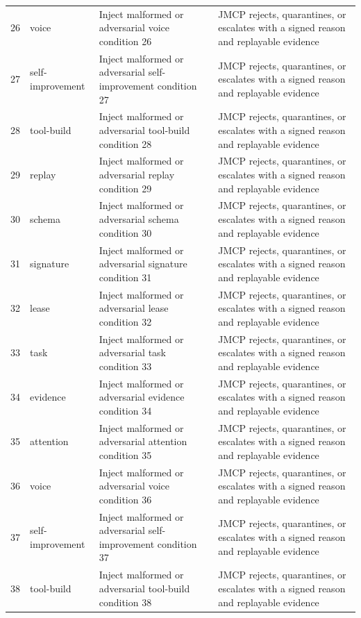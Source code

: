 \documentclass[10pt,journal,onecolumn]{IEEEtran}
\begin{document}
\begin{longtable}{P{0.05\textwidth} P{0.16\textwidth} P{0.38\textwidth} P{0.33\textwidth}}
26 & voice & Inject malformed or adversarial voice condition 26 & JMCP rejects, quarantines, or escalates with a signed reason and replayable evidence \\
27 & self-improvement & Inject malformed or adversarial self-improvement condition 27 & JMCP rejects, quarantines, or escalates with a signed reason and replayable evidence \\
28 & tool-build & Inject malformed or adversarial tool-build condition 28 & JMCP rejects, quarantines, or escalates with a signed reason and replayable evidence \\
29 & replay & Inject malformed or adversarial replay condition 29 & JMCP rejects, quarantines, or escalates with a signed reason and replayable evidence \\
30 & schema & Inject malformed or adversarial schema condition 30 & JMCP rejects, quarantines, or escalates with a signed reason and replayable evidence \\
31 & signature & Inject malformed or adversarial signature condition 31 & JMCP rejects, quarantines, or escalates with a signed reason and replayable evidence \\
32 & lease & Inject malformed or adversarial lease condition 32 & JMCP rejects, quarantines, or escalates with a signed reason and replayable evidence \\
33 & task & Inject malformed or adversarial task condition 33 & JMCP rejects, quarantines, or escalates with a signed reason and replayable evidence \\
34 & evidence & Inject malformed or adversarial evidence condition 34 & JMCP rejects, quarantines, or escalates with a signed reason and replayable evidence \\
35 & attention & Inject malformed or adversarial attention condition 35 & JMCP rejects, quarantines, or escalates with a signed reason and replayable evidence \\
36 & voice & Inject malformed or adversarial voice condition 36 & JMCP rejects, quarantines, or escalates with a signed reason and replayable evidence \\
37 & self-improvement & Inject malformed or adversarial self-improvement condition 37 & JMCP rejects, quarantines, or escalates with a signed reason and replayable evidence \\
38 & tool-build & Inject malformed or adversarial tool-build condition 38 & JMCP rejects, quarantines, or escalates with a signed reason and replayable evidence \\

\end{longtable}
\end{document}
